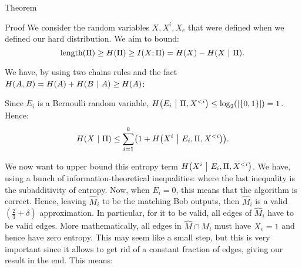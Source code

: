\documentclass[a4paper]{article}
\begin{document}
\begin{parag}{Theorem}
\begin{subparag}{Proof}
        We consider the random variables $X, X^i, X_e$ that were defined when we defined our hard distribution. We aim to bound: 
        \[\text{length}\left(\Pi\right) \geq H\left(\Pi\right) \geq I\left(X; \Pi\right) = H\left(X\right) - H\left(X \suchthat \Pi\right).\]
        
        We have, by using two chains rules and the fact $H\left(A, B\right) = H\left(A\right) + H\left(B \suchthat A\right) \geq H\left(A\right)$: 

        Since $E_i$ is a Bernoulli random variable, $H\left(E_i \suchthat \Pi, X^{< i}\right) \leq \log_2\left(\left|\left\{0, 1\right\}\right|\right) = 1$. Hence: 
        \[H\left(X \suchthat \Pi\right) \leq \sum_{i=1}^{k} \left(1 + H\left(X^i \suchthat E_i, \Pi, X^{<i}\right)\right).\]
        
        We now want to upper bound this entropy term $H\left(X^i \suchthat E_i, \Pi, X^{< i}\right)$. We have, using a bunch of information-theoretical inequalities: 
        where the last inequality is the subadditivity of entropy. Now, when $E_i = 0$, this means that the algorithm is correct. Hence, leaving $\hat{M}_i$ to be the matching Bob outputs, then $\hat{M}_i$ is a valid $\left(\frac{2}{3} + \delta\right)$ approximation. In particular, for it to be valid, all edges of $\hat{M}_i$ have to be valid edges. More mathematically, all edges in $\hat{M} \cap M_i$ must have $X_e = 1$ and hence have zero entropy. This may seem like a small step, but this is very important since it allows to get rid of a constant fraction of edges, giving our result in the end. This means: 


\end{subparag}
\end{parag}
\end{document}
